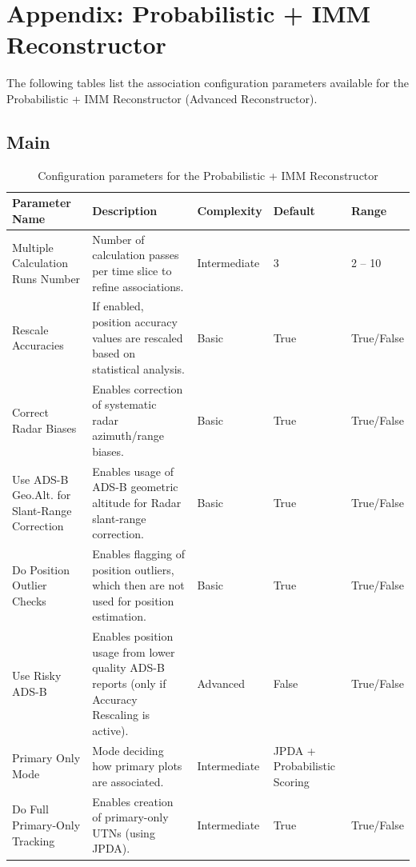 \section{Appendix: Probabilistic + IMM Reconstructor}
\label{sec:appendix_reconst_advanced}


The following tables list the association configuration parameters available for the Probabilistic + IMM Reconstructor (Advanced Reconstructor).

\subsection{Main}

\begin{table}[H]
    \centering
    \footnotesize
    \hspace*{-1.5cm}
    \begin{tabular}{|p{4cm}|p{5.5cm}|l|p{2cm}|p{2.5cm}|}
    \hline
    \textbf{Parameter Name} & \textbf{Description} & \textbf{Complexity} & \textbf{Default} & \textbf{Range} \\ \hline
    Multiple Calculation Runs Number & Number of calculation passes per time slice to refine associations. & Intermediate & 3 & 2 -- 10 \\ \hline
    Rescale Accuracies & If enabled, position accuracy values are rescaled based on statistical analysis. & Basic & True & True/False \\ \hline
    Correct Radar Biases & Enables correction of systematic radar azimuth/range biases. & Basic & True & True/False \\ \hline
    Use ADS-B Geo.Alt. for Slant-Range Correction & Enables usage of ADS-B geometric altitude for Radar slant-range correction. & Basic & True & True/False \\ \hline
    Do Position Outlier Checks & Enables flagging of position outliers, which then are not used for position estimation. & Basic & True & True/False \\ \hline
    Use Risky ADS-B & Enables position usage from lower quality ADS-B reports (only if Accuracy Rescaling is active). & Advanced & False & True/False \\ \hline
    Primary Only Mode & Mode deciding how primary plots are associated. & Intermediate & JPDA + Probabilistic Scoring & \\ \hline
    Do Full Primary-Only Tracking & Enables creation of primary-only UTNs (using JPDA). & Intermediate & True & True/False \\ \hline
    \end{tabular}
    \caption{Configuration parameters for the Probabilistic + IMM Reconstructor}
\end{table}
\ \\

